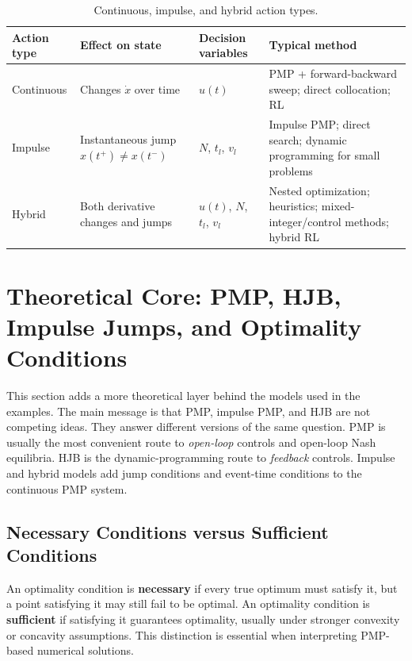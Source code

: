 \documentclass[11pt,a4paper]{article}
\begin{document}
\begin{table}[h!]
\centering
\caption{Continuous, impulse, and hybrid action types.}
\begin{tabularx}{\textwidth}{L{2.6cm}Y L{3.2cm}Y}
\toprule
\textbf{Action type} & \textbf{Effect on state} & \textbf{Decision variables} & \textbf{Typical method} \\
\midrule
Continuous & Changes $\dot{x}$ over time & $u(t)$ & PMP + forward-backward sweep; direct collocation; RL \\
Impulse & Instantaneous jump $x(t^+)\neq x(t^-)$ & $N$, $t_l$, $v_l$ & Impulse PMP; direct search; dynamic programming for small problems \\
Hybrid & Both derivative changes and jumps & $u(t)$, $N$, $t_l$, $v_l$ & Nested optimization; heuristics; mixed-integer/control methods; hybrid RL \\
\bottomrule
\end{tabularx}
\end{table}


\section{Theoretical Core: PMP, HJB, Impulse Jumps, and Optimality Conditions}

This section adds a more theoretical layer behind the models used in the examples. The main message is that PMP, impulse PMP, and HJB are not competing ideas. They answer different versions of the same question.
PMP is usually the most convenient route to \emph{open-loop} controls and open-loop Nash equilibria. HJB is the dynamic-programming route to \emph{feedback} controls. Impulse and hybrid models add jump conditions and event-time conditions to the continuous PMP system.

\subsection{Necessary Conditions versus Sufficient Conditions}

An optimality condition is \textbf{necessary} if every true optimum must satisfy it, but a point satisfying it may still fail to be optimal. An optimality condition is \textbf{sufficient} if satisfying it guarantees optimality, usually under stronger convexity or concavity assumptions. This distinction is essential when interpreting PMP-based numerical solutions.
\end{document}
